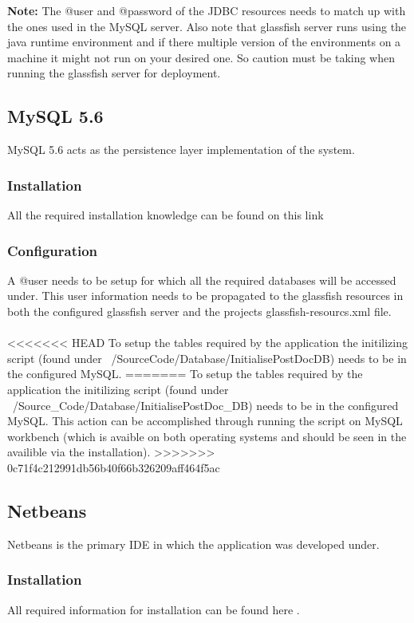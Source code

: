 \documentclass[12pt]{article}
\begin{document}
\textbf{Note:} The @user and @password of the JDBC resources needs to match up with the ones used in the MySQL server. Also note that glassfish server runs using the java runtime environment and if there multiple version of the environments on a machine it might not run on your desired one. So caution must be taking when running the glassfish server for deployment.\\
\subsection{MySQL 5.6}
MySQL 5.6 acts as the persistence layer implementation of the system.

\subsubsection{Installation}
All the required installation knowledge can be found on this link \textbf{} 

\subsubsection{Configuration}
A @user needs to be setup for which all the required databases will be accessed under. This user information needs to be propagated to the glassfish resources in both the configured glassfish server and the projects glassfish-resourcs.xml file.
\\
\\
<<<<<<< HEAD
To setup the tables required by the application the initilizing script (found under ~/SourceCode/Database/InitialisePostDocDB) needs to be in the configured MySQL.
=======
To setup the tables required by the application the initilizing script (found under ~/Source\_Code/Database/InitialisePostDoc\_DB) needs to be in the configured MySQL. This action can be accomplished through running the script on MySQL workbench (which is avaible on both operating systems and should be seen in the availible via the installation).
>>>>>>> 0c71f4c212991db56b40f66b326209aff464f5ac

\subsection{Netbeans} 
Netbeans is the primary IDE in which the application was developed under.

\subsubsection{Installation}
All required information for installation can be found here \textbf{}.
\end{document}
